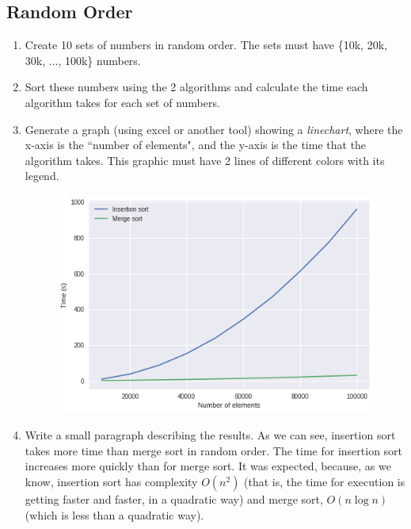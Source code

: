 \documentclass{article}
\begin{document}
\subsection{Random Order}
\begin{enumerate}
  \item Create 10 sets of numbers in random order. The sets must have \{10k, 20k, 30k, ..., 100k\} numbers.
  
  \item Sort these numbers using the 2 algorithms and calculate the time each algorithm takes for each set of numbers.
  
  \item Generate a graph (using excel or another tool) showing a \emph{linechart}, where the x-axis is the ``number of elements", and the y-axis is the time that the algorithm takes. This graphic must have 2 lines of different colors with its legend.
  \bigbreak
  \begin{figure}[H]
      \centering
      \includegraphics[scale = 0.8]{Random_order}
  \end{figure}
  \bigbreak
  \item Write a small paragraph describing the results.
  \bigbreak
  As we can see, insertion sort takes more time than merge sort in random order. The time for insertion sort increases more quickly than for merge sort. It was expected, because, as we know, insertion sort has complexity $O(n^2)$ (that is, the time for execution is getting faster and faster, in a quadratic way) and merge sort, $O(n\log n)$ (which is less than a quadratic way).
  \bigbreak
\end{enumerate}
\end{document}
